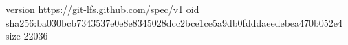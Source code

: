 version https://git-lfs.github.com/spec/v1
oid sha256:ba030bcb7343537e0e8e8345028dcc2bce1ce5a9db0fdddaeedebea470b052e4
size 22036
